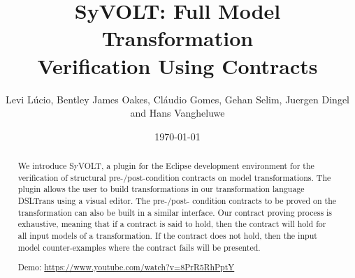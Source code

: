 \documentclass[conference]{IEEEtran}
\begin{document}
\title{SyVOLT: Full Model Transformation\\Verification Using Contracts}
\author{Levi L\'{u}cio, Bentley James Oakes, Cl\'{a}udio Gomes, Gehan Selim,
Juergen Dingel and Hans Vangheluwe}

\author{
	} 

\date{\today}


\maketitle 




\begin{abstract}
 
We introduce SyVOLT, a plugin for the Eclipse development environment for the
verification of structural pre-/post-condition contracts on model
transformations. The plugin allows the user to build transformations in our
transformation language DSLTrans using a visual editor. The pre-/post- condition
contracts to be proved on the transformation can also be built in a similar
interface. Our contract proving process is exhaustive, meaning that if a
contract is said to hold, then the contract will hold for all input models of a
transformation. If the contract does not hold, then the input model
counter-examples where the contract fails will be presented.

Demo: \url{https://www.youtube.com/watch?v=8PrR5RhPptY}



\end{abstract}
\end{document}
